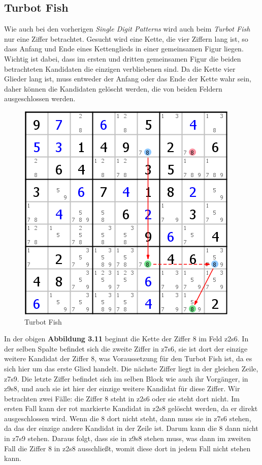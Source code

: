 \newpage
\subsection{Turbot Fish}
Wie auch bei den vorherigen \textit{Single Digit Patterns} wird auch beim \textit{Turbot Fish} nur eine Ziffer betrachtet. Gesucht wird eine Kette, die vier Ziffern lang ist, so dass Anfang und Ende eines Kettenglieds in einer gemeinsamen Figur liegen. Wichtig ist dabei, dass im ersten und dritten gemeinsamen Figur die beiden betrachteten Kandidaten die einzigen verbliebenen  sind. Da die Kette vier Glieder lang ist, muss entweder der Anfang oder das Ende der Kette wahr sein, daher können die Kandidaten gelöscht werden, die von beiden Feldern ausgeschlossen werden.

\begin{figure}[h]
\begin{center}
\includegraphics{./img/turbot_fish.png}
\caption{Turbot Fish}
\end{center}
\end{figure}

In der obigen \textbf{Abbildung 3.11} beginnt die Kette der Ziffer 8 im Feld z2s6. In der selben Spalte befindet sich die zweite Ziffer in z7s6, sie ist dort der einzige weitere Kandidat der Ziffer 8, was Voraussetzung für den Turbot Fish ist, da es sich hier um das erste Glied handelt. Die nächste Ziffer liegt in der gleichen Zeile, z7s9. Die letzte Ziffer befindet sich im selben Block wie auch ihr Vorgänger, in z9s8, und auch sie ist hier der einzige weitere Kandidat für diese Ziffer. Wir betrachten zwei Fälle: die Ziffer 8 steht in z2s6 oder sie steht dort nicht. Im ersten Fall kann der rot markierte Kandidat in z2s8 gelöscht werden, da er direkt ausgeschlossen wird. Wenn die 8 dort nicht steht, dann muss sie in z7s6 stehen, da das der einzige andere Kandidat in der Zeile ist. Darum kann die 8 dann nicht in z7s9 stehen. Daraus folgt, dass sie in z9s8 stehen muss, was dann im zweiten Fall die Ziffer 8 in z2s8 ausschließt, womit diese dort in jedem Fall nicht stehen kann.
